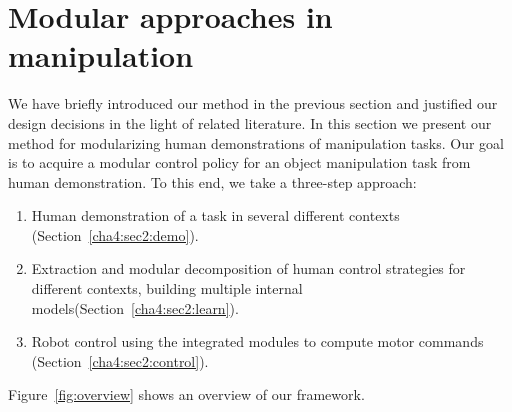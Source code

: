 \section{Modular approaches in manipulation}
\label{cha4:sec2}


We have briefly introduced our method in the previous section and
justified our design decisions in the light of related literature.  In
this section we present our method for modularizing human
demonstrations of manipulation tasks. Our goal is to acquire a modular
control policy for an object manipulation task from human
demonstration. To this end, we take a three-step approach:
\begin{enumerate}
\item Human demonstration of a task in several different contexts  (Section~\ref{cha4:sec2:demo}).
\item Extraction and modular decomposition of human control strategies
  for different contexts, building multiple internal models(Section~\ref{cha4:sec2:learn}).
\item Robot control using the integrated modules to compute motor
  commands (Section~\ref{cha4:sec2:control}).
\end{enumerate}

Figure~\ref{fig:overview} shows an overview of our framework.

